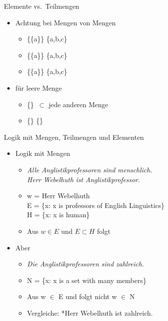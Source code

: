 \begin{frame}
  {Elemente vs.\ Teilmengen}
  \onslide<+->
  \begin{itemize}[<+->]
    \item Achtung bei Mengen von Mengen
      \begin{itemize}[<+->]
        \item \{\{a\}\} \orongsch{$\not\subset$} \{a,b,c\}
        \item \{\{a\}\} \orongsch{$\not\subseteq$} \{a,b,c\}
        \item \{\{a\}\} \orongsch{$\not\in$} \{a,b,c\}
      \end{itemize}
    \Zeile
    \item für leere Menge 
      \begin{itemize}[<+->]
        \item \{\} \alert{$\subset$} jede anderen Menge
        \item \{\} \orongsch{$\not\in$} \{\}
      \end{itemize}
  \end{itemize}
\end{frame}

\begin{frame}
  {Logik mit Mengen, Teilmengen und Elementen}
  \onslide<+->
  \begin{itemize}[<+->]
    \item Logik mit Mengen
        \begin{itemize}[<+->]
        \item \textit{Alle Anglistikprofessoren sind menschlich.}\\
          \textit{Herr Webelhuth ist Anglistikprofessor.}
        \item w = Herr Webelhuth\\
          E = \{x: x is professors of English Linguistics\}\\
          H = \{x: x is human\}
        \item Aus \alert{$w\in E$} und \alert{$E\subset H$} folgt 
      \end{itemize}
      \Halbzeile
    \item Aber
      \begin{itemize}[<+->]
        \item \textit{Die Anglistikprofessoren sind zahlreich.}
        \item N = \{x: x is a set with many members\}
        \item Aus \alert{w $\in$ E} und  folgt nicht \alert{w $\in$ N}
        \item Vergleiche: *Herr Webelhuth ist zahlreich.
      \end{itemize}
  \end{itemize}
\end{frame}

